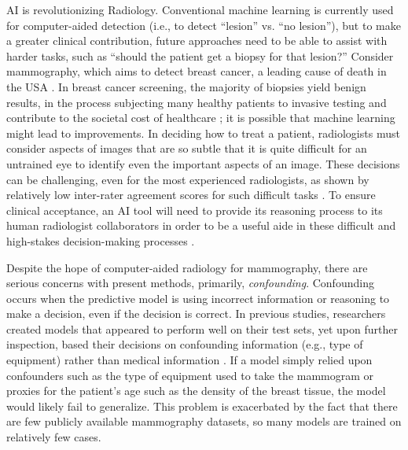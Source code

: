 \documentclass[11pt]{article}
\begin{document}
AI is revolutionizing Radiology. Conventional machine learning is currently used for computer-aided detection (i.e., to detect ``lesion'' vs$.$ ``no lesion''), but to make a greater clinical contribution, future approaches need to be able to assist with harder tasks, such as ``should the patient get a biopsy for that lesion?'' Consider mammography, which aims to detect breast cancer, a leading cause of death in the USA \citep{cdc2019mortality}. In breast cancer screening, the majority of biopsies yield benign results, in the process subjecting many healthy patients to invasive testing and contribute to the societal cost of healthcare \citep{chhatwal2010optimal}; it is possible that machine learning might lead to improvements. 
In deciding how to treat a patient, radiologists must consider aspects of images that are so subtle that it is quite difficult for an untrained eye to identify even the important aspects of an image. These decisions can be challenging, even for the most experienced radiologists, as shown by relatively low inter-rater agreement scores for such difficult tasks \citep{park2007observer, abdullah2009breast, baker1996breast, lazarus2006bi, el2015breast}. To ensure clinical acceptance, an AI tool will need to provide its reasoning process to its human radiologist collaborators in order to be a useful aide in these difficult and high-stakes decision-making processes  \citep{edwards-fda, soffer2019convolutional}.

Despite the hope of computer-aided radiology for mammography, there are serious concerns with present methods, primarily, \textit{confounding}. Confounding occurs when the predictive model is using incorrect information or reasoning to make a decision, even if the decision is correct.  In previous studies, researchers created models that appeared to perform well on their test sets, yet upon further inspection, based their decisions on confounding information (e.g., type of equipment) rather than medical information \citep{badgeley2019deep,winkler2019association,zech2018variable}. If a model simply relied upon confounders such as the type of equipment used to take the mammogram or proxies for the patient's age such as the density of the breast tissue, the model would likely fail to generalize. This problem is exacerbated by the fact that there are few publicly available mammography datasets, so many models are trained on relatively few cases. 
\end{document}
